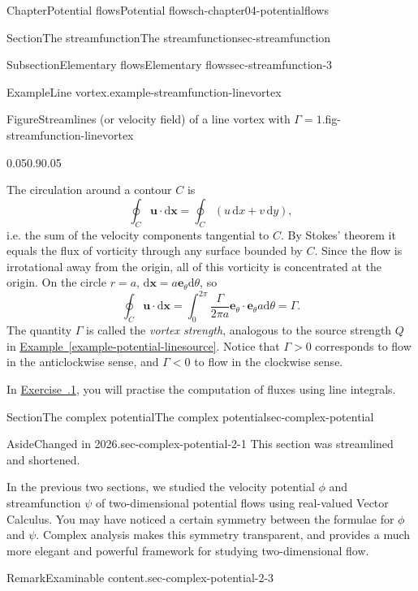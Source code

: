 \documentclass[oneside,10pt,]{book}
\newcommand{\xreffont}{\relax}
\numberwithin{equation}{section}
\newcommand{\de}{\mathrm{d}}
\newcommand{\bx}{\boldsymbol{x}}
\newcommand{\be}{\boldsymbol{e}}
\newcommand{\bu}{\boldsymbol{u}}
\newcommand{\lt}{<}
\newcommand{\gt}{>}
\begin{document}
\begin{chapterptx}{Chapter}{Potential flows}{}{Potential flows}{}{}{ch-chapter04-potentialflows}
\begin{sectionptx}{Section}{The streamfunction}{}{The streamfunction}{}{}{sec-streamfunction}
\begin{subsectionptx}{Subsection}{Elementary flows}{}{Elementary flows}{}{}{sec-streamfunction-3}
\begin{example}{Example}{Line vortex.}{example-streamfunction-linevortex}
\begin{figureptx}{Figure}{Streamlines (or velocity field) of a line vortex with \(\Gamma = 1\).}{fig-streamfunction-linevortex}{}
\begin{image}{0.05}{0.9}{0.05}{}
\end{image}%
\tcblower
\end{figureptx}%
The circulation around a contour \(C\) is%
\begin{equation*}
\oint_C \bu \cdot \de{\bx} = \oint_C (u \, \de{x} + v \, \de{y}),
\end{equation*}
i.e. the sum of the velocity components tangential to \(C\). By Stokes' theorem it equals the flux of vorticity through any surface bounded by \(C\). Since the flow is irrotational away from the origin, all of this vorticity is concentrated at the origin. On the circle \(r = a\), \(\de{\bx} = a \be_{\theta} \de{\theta}\), so%
\begin{equation}
\oint_C \bu \cdot \de{\bx} = \int_0^{2\pi} \frac{\Gamma}{2\pi a} \be_{\theta} \cdot \be_{\theta} a \de\theta = \Gamma.\label{eq-line-vortex-circulation}
\end{equation}
The quantity \(\Gamma\) is called the \emph{vortex strength}, analogous to the source strength \(Q\) in \hyperref[example-potential-linesource]{Example~{\xreffont\ref{example-potential-linesource}}}. Notice that \(\Gamma \gt 0\) corresponds to flow in the anticlockwise sense, and \(\Gamma \lt 0\) to flow in the clockwise sense.%
\end{example}
In \hyperlink{ex-hw-streamfunction-flux-compute}{Exercise~{\xreffont 4.7.1}}, you will practise the computation of fluxes using line integrals.%
\end{subsectionptx}
\end{sectionptx}
%
%
\typeout{************************************************}
\typeout{************************************************}
%
\begin{sectionptx}{Section}{The complex potential}{}{The complex potential}{}{}{sec-complex-potential}
\begin{introduction}{}%
\begin{aside}{Aside}{Changed in 2026.}{sec-complex-potential-2-1}%
This section was streamlined and shortened.%
\end{aside}
In the previous two sections, we studied the velocity potential \(\phi\) and streamfunction \(\psi\) of two-dimensional potential flows using real-valued Vector Calculus. You may have noticed a certain symmetry between the formulae for \(\phi\) and \(\psi\). Complex analysis makes this symmetry transparent, and provides a much more elegant and powerful framework for studying two-dimensional flow.%
\begin{remark}{Remark}{Examinable content.}{sec-complex-potential-2-3}%

\end{remark}
\end{introduction}
\end{sectionptx}
\end{chapterptx}
\end{document}
